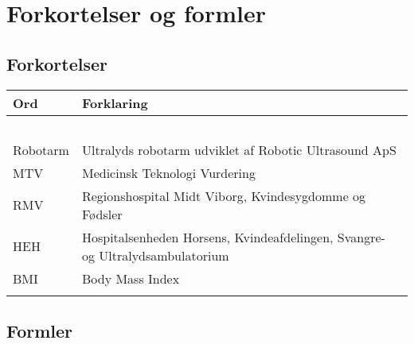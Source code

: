 \chapter{Forkortelser og formler}

\section{Forkortelser}
\begin{longtabu} to 
    Ord &    Forklaring\\
    \toprule\ \\
    Robotarm & Ultralyds robotarm udviklet af Robotic Ultrasound ApS \\
    MTV & Medicinsk Teknologi Vurdering \\
  	RMV & Regionshospital Midt Viborg, Kvindesygdomme og Fødsler \\
  	HEH & Hospitalsenheden Horsens, Kvindeafdelingen, Svangre- og Ultralydsambulatorium \\
  	BMI & Body Mass Index \\
   
\label{forkort}
\end{longtabu}

\section{Formler}